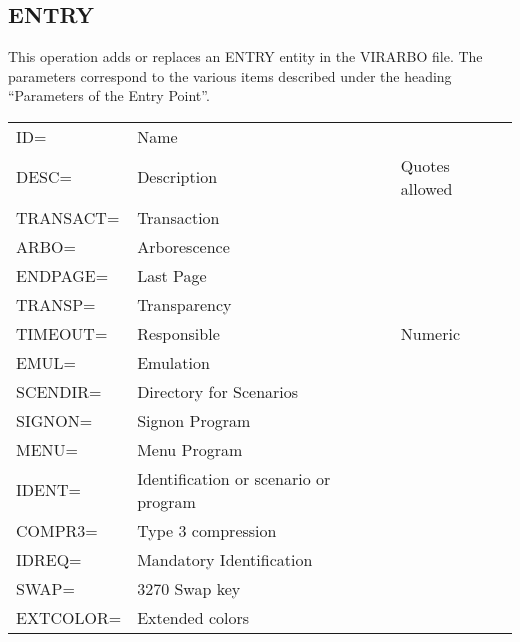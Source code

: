 \documentclass[letterpaper,10pt,english]{sphinxmanual}
\begin{document}

\subsection{ENTRY}
\label{\detokenize{Installation_Guide:entry}}\label{\detokenize{Installation_Guide:index-162}}
This operation adds or replaces an ENTRY entity in the VIRARBO file. The parameters correspond to the various items
described under the heading “Parameters of the Entry Point”.


\begin{savenotes}\sphinxattablestart
\centering
\begin{tabulary}{\linewidth}[t]{|T|T|T|}
\hline
{}\relax &\relax &\relax \\
\hline
ID=
&
Name
&\\
\hline
DESC=
&
Description
&
Quotes allowed
\\
\hline
TRANSACT=
&
Transaction
&\\
\hline
ARBO=
&
Arborescence
&\\
\hline
ENDPAGE=
&
Last Page
&\\
\hline
TRANSP=
&
Transparency
&\\
\hline
TIMEOUT=
&
Responsible
&
Numeric
\\
\hline
EMUL=
&
Emulation
&\\
\hline
SCENDIR=
&
Directory for
Scenarios
&\\
\hline
SIGNON=
&
Signon Program
&\\
\hline
MENU=
&
Menu Program
&\\
\hline
IDENT=
&
Identification or
scenario or program
&\\
\hline
COMPR3=
&
Type 3 compression
&\\
\hline
IDREQ=
&
Mandatory
Identification
&\\
\hline
SWAP=
&
3270 Swap key
&\\
\hline
EXTCOLOR=
&
Extended colors
&\\
\hline
\end{tabulary}
\par
\sphinxattableend\end{savenotes}

\end{document}

